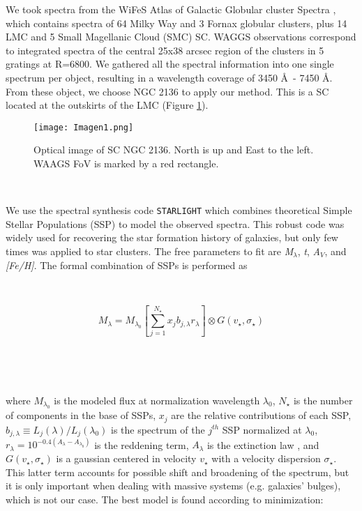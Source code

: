 \documentclass[baaa]{baaa}
\begin{document}
We took spectra from the WiFeS Atlas of Galactic Globular cluster Spectra {\citep{WWAGGS},} which contains spectra of 64 Milky Way and 3 Fornax globular clusters, plus 14 LMC and 5 Small Magellanic Cloud (SMC) SC. WAGGS observations correspond to integrated spectra of the central 25x38 arcsec region of the clusters in 5 gratings at R=6800. We gathered all the spectral information into one single spectrum per object, resulting in a wavelength coverage of 3450 \AA\ - 7450 \AA. From these object, we choose NGC 2136 to apply our method. This is a SC located at the outskirts of the LMC (Figure \ref{image}).

\begin{figure}[!t]
\centering
\texttt{[image: Imagen1.png]}
\caption{Optical image of SC NGC 2136. North is up and East to the left. WAAGS FoV is marked by a red rectangle.}
\label{image}
\end{figure}

\

We use the spectral synthesis code {\tt STARLIGHT} \citep{Cid} which combines theoretical Simple Stellar Populations (SSP) to model the observed spectra. This robust code was widely used for recovering the star formation history of galaxies, but only few times was applied to star clusters. The free parameters to fit are {\it M$_\lambda$}, {\it t}, {\it A$_V$}, and {\it [Fe/H]}. The formal combination of SSPs is performed as

\

\begin{equation}
\label{eq:Stl_02}
M_\lambda = M_{\lambda_0} \left[\sum_{j=1}^{N_\star} x_j b_{j,\lambda}
  r_\lambda \right] \otimes G(v_\star,\sigma_\star)
\end{equation}

\

\


where $M_{\lambda_0}$ is the modeled flux at normalization wavelength $\lambda_0$, $N_\star$ is the number of components in the base of SSPs, $x_j$ are the relative contributions of each SSP, $b_{j,\lambda} \equiv L_j(\lambda) / L_j(\lambda_0)$ is the spectrum of the $j^{th}$ SSP normalized at $\lambda_0$, $r_\lambda = 10^{-0.4(A_\lambda-A_{\lambda_0})}$ is the reddening term, $A_\lambda$ is the extinction law \citep{CCM}, and $G(v_\star,\sigma_\star)$ is a gaussian centered in velocity $v_\star$ with a velocity dispersion $\sigma_\star$. This latter term accounts for possible shift and broadening of the spectrum, but it is only important when dealing with massive systems (e.g. galaxies' bulges), which is not our case. The best model is found according to minimization:
\end{document}
